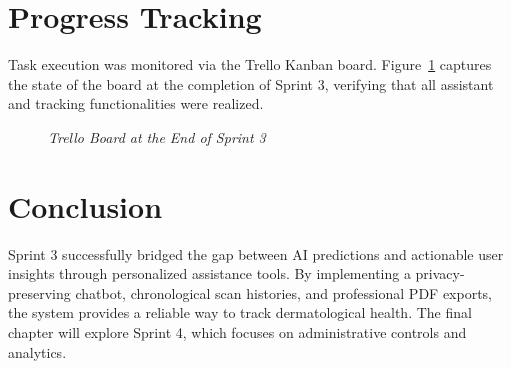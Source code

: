 \section{Progress Tracking}
Task execution was monitored via the Trello Kanban board. Figure~\ref{fig:trello_sprint3} captures the state of the board at the completion of Sprint 3, verifying that all assistant and tracking functionalities were realized.

\begin{figure}[H]
	\centering
	\caption{\textit{Trello Board at the End of Sprint 3}}
	\label{fig:trello_sprint3}
\end{figure}

\section{Conclusion}
Sprint 3 successfully bridged the gap between AI predictions and actionable user insights through personalized assistance tools. By implementing a privacy-preserving chatbot, chronological scan histories, and professional PDF exports, the system provides a reliable way to track dermatological health. The final chapter will explore Sprint 4, which focuses on administrative controls and analytics.
